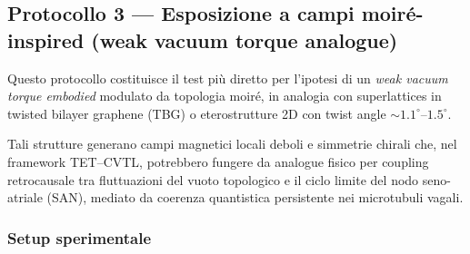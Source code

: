 \documentclass[11pt,a4paper]{article}
\theoremstyle{plain}
\theoremstyle{definition}
\begin{document}
\vspace{0.6cm}



\subsection{Protocollo 3 — Esposizione a campi moiré-inspired (weak vacuum torque analogue)}

\vspace{0.2cm}

Questo protocollo costituisce il test più diretto per l'ipotesi di un \emph{weak vacuum torque embodied} modulato da topologia moiré, in analogia con superlattices in twisted bilayer graphene (TBG) o eterostrutture 2D con twist angle $\sim 1.1^\circ$--$1.5^\circ$. 

\vspace{0.3cm}

Tali strutture generano campi magnetici locali deboli e simmetrie chirali che, nel framework TET--CVTL, potrebbero fungere da analogue fisico per coupling retrocausale tra fluttuazioni del vuoto topologico e il ciclo limite del nodo seno-atriale (SAN), mediato da coerenza quantistica persistente nei microtubuli vagali.

\subsubsection{Setup sperimentale}

\vspace{0.2cm}
\end{document}
